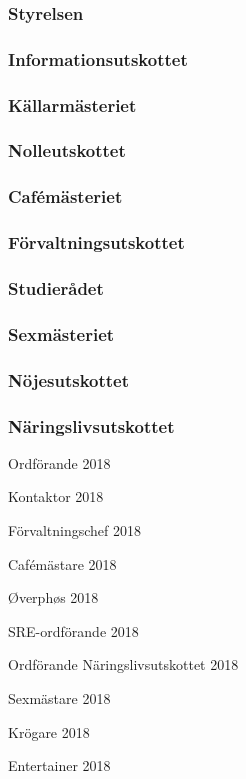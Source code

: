 \documentclass[../_main/handlingar.tex]{subfiles}
\begin{document}

\subsubsection*{Styrelsen}

\subsubsection*{Informationsutskottet}

\subsubsection*{Källarmästeriet}

\subsubsection*{Nolleutskottet}

\subsubsection*{Cafémästeriet}

\subsubsection*{Förvaltningsutskottet}

\subsubsection*{Studierådet}



\subsubsection*{Sexmästeriet}

\subsubsection*{Nöjesutskottet}

\subsubsection*{Näringslivsutskottet}

\newpage
\begin{signatures}{10}
    \mvh
    \signature{Daniel Bakic}{Ordförande 2018}
    \signature{Axel Voss}{Kontaktor 2018}
    \signature{Magnus Lundh}{Förvaltningschef 2018}
    \signature{Elin Johansson}{Cafémästare 2018}
    \signature{Andreas Bennström}{Øverphøs 2018}
    \signature{Fanny Månefjord}{SRE-ordförande 2018}
    \signature{Isabella Hansen}{Ordförande Näringslivsutskottet 2018}
    \signature{Alexander Wik}{Sexmästare 2018}
    \signature{Malin Heyden}{Krögare 2018}
    \signature{Adam Belfrage}{Entertainer 2018}
\end{signatures}
\end{document}
